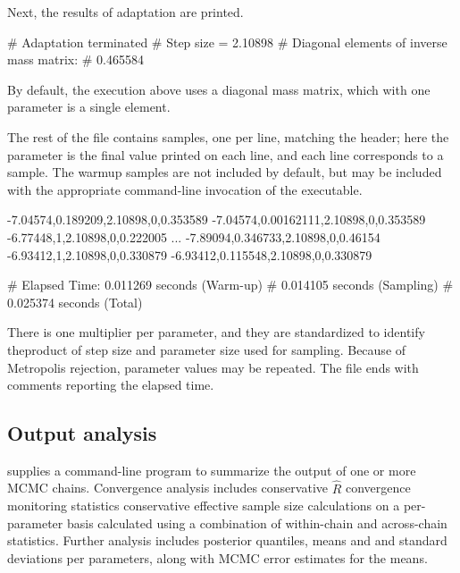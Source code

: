 \documentclass[article]{jss}
\begin{document}
Next, the results of adaptation are printed.
%
\begin{Code}
# Adaptation terminated
# Step size = 2.10898
# Diagonal elements of inverse mass matrix:
# 0.465584
\end{Code}
%
By default, the execution above uses a diagonal mass matrix, which
with one parameter is a single element.

The rest of the file contains samples, one per line, matching the
header; here the parameter  is the final value printed on
each line, and each line corresponds to a sample.  The warmup samples
are not included by default, but may be included with the appropriate
command-line invocation of the executable.
%
\begin{Code}
-7.04574,0.189209,2.10898,0,0.353589
-7.04574,0.00162111,2.10898,0,0.353589
-6.77448,1,2.10898,0,0.222005
...
-7.89094,0.346733,2.10898,0,0.46154
-6.93412,1,2.10898,0,0.330879
-6.93412,0.115548,2.10898,0,0.330879

# Elapsed Time: 0.011269 seconds (Warm-up)
#               0.014105 seconds (Sampling)
#               0.025374 seconds (Total)
\end{Code}
%

%
There is one multiplier per parameter, and they are standardized to
identify theproduct of step size and parameter size used for sampling.
Because of Metropolis rejection, parameter values may be repeated.
The file ends with comments reporting the elapsed time.

\subsection{Output analysis}

 supplies a command-line program  to
summarize the output of one or more MCMC chains.  Convergence analysis
includes conservative $\hat{R}$ convergence monitoring statistics 
\citep{GelmanRubin:1992, GelmanEtAl:2013}
conservative effective sample size calculations on a per-parameter
basis calculated using a combination of within-chain and across-chain
statistics.  Further analysis includes posterior quantiles, means and
and standard deviations per parameters, along with MCMC error
estimates for the means.
\end{document}
